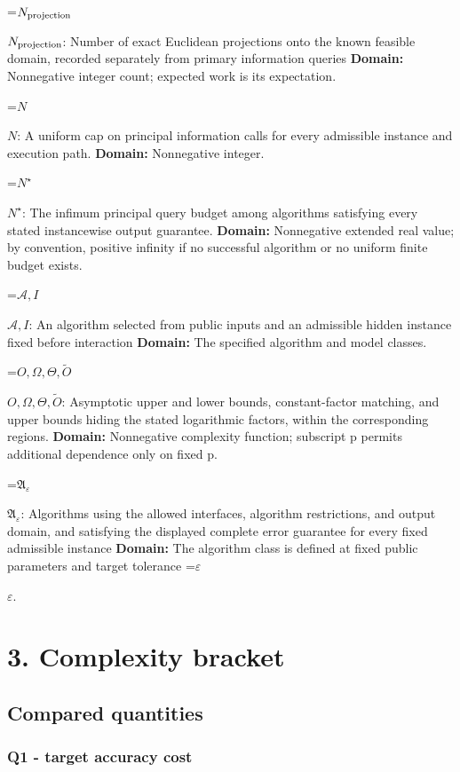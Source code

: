 \documentclass[10pt,a4paper]{article}
\newcommand{\AtlasMath}[1]{\par\begingroup\centering\setbox0=\hbox{$\displaystyle #1$}\ifdim\wd0>1.4\linewidth\typeout{ATLAS WIDE FORMULA: \the\wd0}\fi\ifdim\wd0>\linewidth\resizebox{\linewidth}{!}{\box0}\else\box0\fi\par\endgroup}
\newcommand{\AtlasInlineMath}[1]{\begingroup\setbox0=\hbox{$#1$}\ifdim\wd0>.4\linewidth\endgroup\AtlasMath{#1}\else\endgroup$#1$\fi}
\begin{document}
\AtlasInlineMath{N_{\rm projection}}: Number of exact Euclidean projections onto the known feasible domain, recorded separately from primary information queries \textbf{Domain:} Nonnegative integer count; expected work is its expectation.



\AtlasInlineMath{N}: A uniform cap on principal information calls for every admissible instance and execution path. \textbf{Domain:} Nonnegative integer.



\AtlasInlineMath{N^\star}: The infimum principal query budget among algorithms satisfying every stated instancewise output guarantee. \textbf{Domain:} Nonnegative extended real value; by convention, positive infinity if no successful algorithm or no uniform finite budget exists.



\AtlasInlineMath{\mathcal A,I}: An algorithm selected from public inputs and an admissible hidden instance fixed before interaction \textbf{Domain:} The specified algorithm and model classes.



\AtlasInlineMath{O,\Omega,\Theta,\widetilde O}: Asymptotic upper and lower bounds, constant-factor matching, and upper bounds hiding the stated logarithmic factors, within the corresponding regions. \textbf{Domain:} Nonnegative complexity function; subscript p permits additional dependence only on fixed p.



\AtlasInlineMath{\mathfrak A_\varepsilon}: Algorithms using the allowed interfaces, algorithm restrictions, and output domain, and satisfying the displayed complete error guarantee for every fixed admissible instance \textbf{Domain:} The algorithm class is defined at fixed public parameters and target tolerance \AtlasInlineMath{\varepsilon}.



\section{3. Complexity bracket}


\subsection{Compared quantities}


\subsubsection{Q1 - target accuracy cost}
\end{document}
